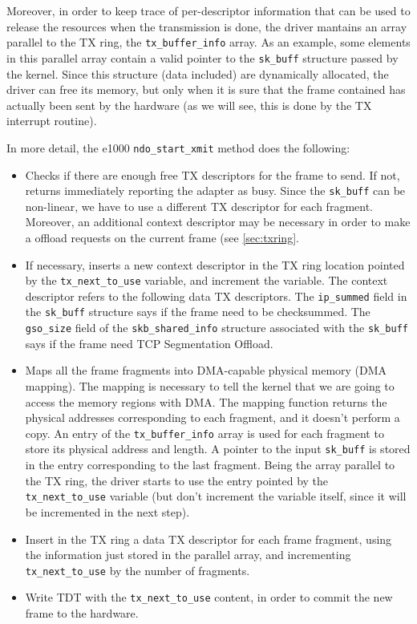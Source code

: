 Moreover, in order to keep trace of per-descriptor information that can be used to release the resources when the transmission is done, 
the driver mantains an array parallel to the TX ring, the \texttt{tx\_buffer\_info} array.
As an example, some elements in this parallel array contain a valid pointer to the \texttt{sk\_buff} structure passed by the kernel. Since
this structure (data included) are dynamically allocated, the driver can free its memory, but only when it is sure that the frame 
contained has actually been sent by the hardware (as we will see, this is done by the TX interrupt routine).

\vspace{0.5cm}

In more detail, the e1000 \texttt{ndo\_start\_xmit} method does the following:
\begin{itemize}
    \item Checks if there are enough free TX descriptors for the frame to send. If not, returns immediately reporting the adapter as busy.
          Since the \texttt{sk\_buff} can be non-linear, we have to use a different TX descriptor for each fragment. Moreover, an additional
	  context descriptor may be necessary in order to make a offload requests on the current frame (see \ref{sec:txring}.

    \item If necessary, inserts a new context descriptor in the TX ring location pointed by the \texttt{tx\_next\_to\_use} variable, and
	  increment the variable. The context descriptor refers to the following data TX descriptors.
	  The \texttt{ip\_summed} field in the \texttt{sk\_buff} structure says if the frame need to be checksummed. The \texttt{gso\_size}
	  field of the \texttt{skb\_shared\_info} structure associated with the \texttt{sk\_buff} says if the frame need TCP Segmentation
	  Offload.

    \item Maps all the frame fragments into DMA-capable physical memory (DMA mapping). The mapping is necessary to tell the kernel that
	  we are going to access the memory regions with DMA. The mapping function returns the physical addresses corresponding to each
	  fragment, and it doesn't perform a copy. An entry of the \texttt{tx\_buffer\_info} array is used for each fragment to store
	  its physical address and length. A pointer to the input \texttt{sk\_buff} is stored in the entry corresponding to the last
	  fragment. Being the array parallel to the TX ring, the driver starts to use the entry pointed by the \texttt{tx\_next\_to\_use} 
	  variable (but don't increment the variable itself, since it will be incremented in the next step).
	  
    \item Insert in the TX ring a data TX descriptor for each frame fragment, using the information just stored in the parallel array,
	  and incrementing \texttt{tx\_next\_to\_use} by the number of fragments.
	  
    \item Write TDT with the \texttt{tx\_next\_to\_use} content, in order to commit the new frame to the hardware.
\end{itemize}


